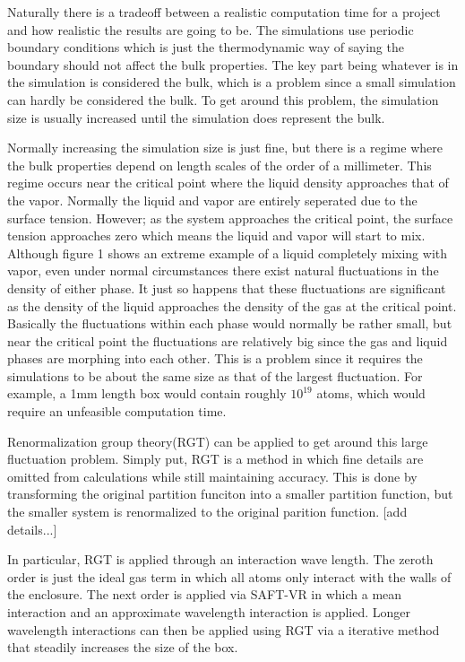 Naturally there is a tradeoff between a realistic computation time for a project and how realistic the results are going to be. The simulations use periodic boundary conditions which is just the thermodynamic way of saying the boundary should not affect the bulk properties. The key part being whatever is in the simulation is considered the bulk, which is a problem since a small simulation can hardly be considered the bulk. To get around this problem, the simulation size is usually increased until the simulation does represent the bulk. 

Normally increasing the simulation size is just fine, but there is a regime where the bulk properties depend on length scales of the order of a millimeter. This regime occurs near the critical point where the liquid density approaches that of the vapor. Normally the liquid and vapor are entirely seperated due to the surface tension. However; as the system approaches the critical point, the surface tension approaches zero which means the liquid and vapor will start to mix. Although figure 1 shows an extreme example of a liquid completely mixing with vapor, even under normal circumstances there exist natural fluctuations in the density of either phase. It just so happens that these fluctuations are significant as the density of the liquid approaches the density of the gas at the critical point. Basically the fluctuations within each phase would normally be rather small, but near the critical point the fluctuations are relatively big since the gas and liquid phases are morphing into each other. This is a problem since it requires the simulations to be about the same size as that of the largest fluctuation. For example, a 1mm length box would contain roughly $10^{19}$ atoms, which would require an unfeasible computation time.

Renormalization group theory(RGT) can be applied to get around this large fluctuation problem. Simply put, RGT is a method in which fine details are omitted from calculations while still maintaining accuracy. This is done by transforming the original partition funciton into a smaller partition function, but the smaller system is renormalized to the original parition function. [add details...]

In particular, RGT is applied through an interaction wave length. The zeroth order is just the ideal gas term in which all atoms only interact with the walls of the enclosure. The next order is applied via SAFT-VR in which a mean interaction and an approximate wavelength interaction is applied. Longer wavelength interactions can then be applied using RGT via a iterative method that steadily increases the size of the box.

